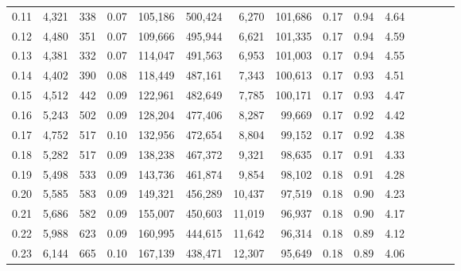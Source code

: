 \begin{tabular}{rrrcrrrrrrrrrrr}
0.11 &   4,321 &     338 &                                       0.07 &  105,186 &  500,424 &    6,270 &  101,686 &  0.17 &  0.94 &                         4.64 \\
0.12 &   4,480 &     351 &                                       0.07 &  109,666 &  495,944 &    6,621 &  101,335 &  0.17 &  0.94 &                         4.59 \\
0.13 &   4,381 &     332 &                                       0.07 &  114,047 &  491,563 &    6,953 &  101,003 &  0.17 &  0.94 &                         4.55 \\
0.14 &   4,402 &     390 &                                       0.08 &  118,449 &  487,161 &    7,343 &  100,613 &  0.17 &  0.93 &                         4.51 \\
0.15 &   4,512 &     442 &                                       0.09 &  122,961 &  482,649 &    7,785 &  100,171 &  0.17 &  0.93 &                         4.47 \\
0.16 &   5,243 &     502 &                                       0.09 &  128,204 &  477,406 &    8,287 &   99,669 &  0.17 &  0.92 &                         4.42 \\
0.17 &   4,752 &     517 &                                       0.10 &  132,956 &  472,654 &    8,804 &   99,152 &  0.17 &  0.92 &                         4.38 \\
0.18 &   5,282 &     517 &                                       0.09 &  138,238 &  467,372 &    9,321 &   98,635 &  0.17 &  0.91 &                         4.33 \\
0.19 &   5,498 &     533 &                                       0.09 &  143,736 &  461,874 &    9,854 &   98,102 &  0.18 &  0.91 &                         4.28 \\
0.20 &   5,585 &     583 &                                       0.09 &  149,321 &  456,289 &   10,437 &   97,519 &  0.18 &  0.90 &                         4.23 \\
0.21 &   5,686 &     582 &                                       0.09 &  155,007 &  450,603 &   11,019 &   96,937 &  0.18 &  0.90 &                         4.17 \\
0.22 &   5,988 &     623 &                                       0.09 &  160,995 &  444,615 &   11,642 &   96,314 &  0.18 &  0.89 &                         4.12 \\
0.23 &   6,144 &     665 &                                       0.10 &  167,139 &  438,471 &   12,307 &   95,649 &  0.18 &  0.89 &                         4.06 \\

\end{tabular}
